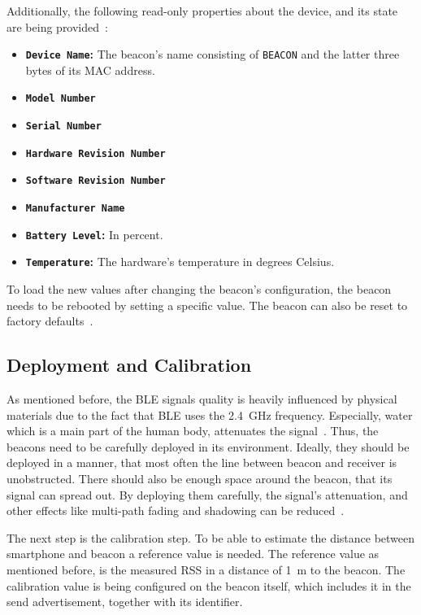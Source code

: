  Additionally, the following read-only properties about the device, and its state are being provided~\citep{binside:ds}:
\begin{itemize}
  \item \textbf{\texttt{Device Name}:} The beacon's name consisting of \texttt{BEACON} and the latter three bytes of its \acs{MAC} address.
  \item \textbf{\texttt{Model Number}}
  \item \textbf{\texttt{Serial Number}}
  \item \textbf{\texttt{Hardware Revision Number}}
  \item \textbf{\texttt{Software Revision Number}}
  \item \textbf{\texttt{Manufacturer Name}}
  \item \textbf{\texttt{Battery Level}:} In percent.
  \item \textbf{\texttt{Temperature}:} The hardware's temperature in degrees Celsius.
\end{itemize}

To load the new values after changing the beacon's configuration, the beacon needs to be rebooted by setting a specific value. The beacon can also be reset to factory defaults~\citep{binside:ds}.

\subsection{Deployment and Calibration}
As mentioned before, the \ac{BLE} signals quality is heavily influenced by physical materials due to the fact that \ac{BLE} uses the 2.4~GHz frequency. Especially, water which is a main part of the human body, attenuates the signal~\citep{apple:getting_started}. Thus, the beacons need to be carefully deployed in its environment. Ideally, they should be deployed in a manner, that most often the line between beacon and receiver is unobstructed. There should also be enough space around the beacon, that its signal can spread out. By deploying them carefully, the signal's attenuation, and other effects like multi-path fading and shadowing can be reduced~\citep{apple:getting_started,IEEE:survey_wireless_indoor_pos}.

The next step is the calibration step. To be able to estimate the distance between smartphone and beacon a reference value is needed. The reference value as mentioned before, is the measured \ac{RSS} in a distance of 1~m to the beacon. The calibration value is being configured on the beacon itself, which includes it in the send advertisement, together with its identifier.

